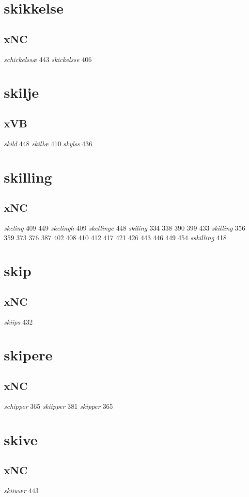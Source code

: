 \documentclass[a4paper,twocolumn]{article}
\begin{document}
\section{skikkelse}
\label{sec:org4f547c3}
\subsection{xNC}
\label{sec:org927f27b}
\emph{schickelssæ} 443 \emph{skickelsse} 406 
\section{skilje}
\label{sec:orgba0592c}
\subsection{xVB}
\label{sec:org81fd08e}
\emph{skild} 448 \emph{skillæ} 410 \emph{skylss} 436 
\section{skilling}
\label{sec:orgff413ec}
\subsection{xNC}
\label{sec:org8c45cae}
\emph{skeling} 409 449 \emph{skelingh} 409 \emph{skellinge} 448 \emph{skiling} 334 338 390 399 433 \emph{skilling} 356 359 373 376 387 402 408 410 412 417 421 426 443 446 449 454 \emph{sskilling} 418 
\section{skip}
\label{sec:org60ab8d2}
\subsection{xNC}
\label{sec:org27f0c19}
\emph{skiips} 432 
\section{skipere}
\label{sec:org7aa2c46}
\subsection{xNC}
\label{sec:orgbe1d91c}
\emph{schipper} 365 \emph{skiipper} 381 \emph{skipper} 365 
\section{skive}
\label{sec:org9aaf5c6}
\subsection{xNC}
\label{sec:orgc610496}
\emph{skiiwær} 443 
\end{document}
